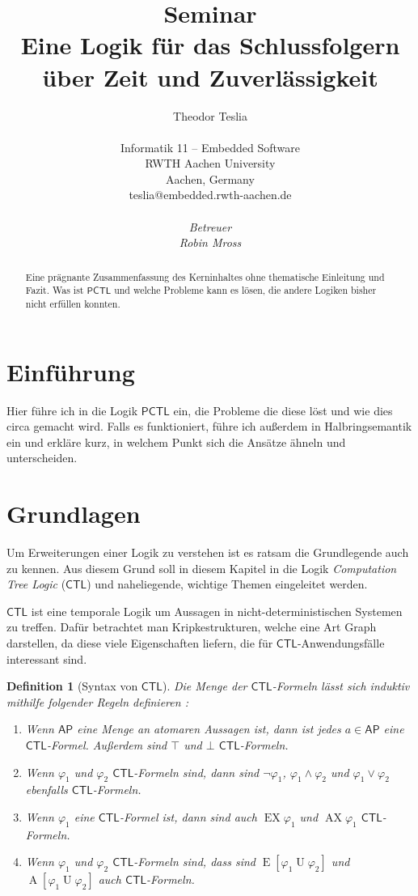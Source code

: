 \documentclass{lni}
\author{
	Theodor Teslia \\ 
	\\ 
	Informatik 11 -- Embedded Software \\ 
	RWTH Aachen University \\ 
	Aachen, Germany \\ 
	teslia@embedded.rwth-aachen.de\\
	\\
	\textit{Betreuer}\\
	\textit{Robin Mross}\\ %
}
\title{\small{Seminar} \\ \vspace{0.5cm} \Large{Eine Logik für das Schlussfolgern über Zeit und Zuverlässigkeit}}
\theoremstyle{def_style}
\newtheorem{definition}{Definition}[section]
\theoremstyle{break}
\newcommand{\AU}[2]{\operatorname{A}[#1\operatorname{U}#2]}
\newcommand{\EU}[2]{\operatorname{E}[#1\operatorname{U}#2]}
\newcommand{\CTL}{\mathsf{CTL}}
\newcommand{\PCTL}{\mathsf{PCTL}}
\begin{document}
\maketitle

\begin{abstract}
Eine prägnante Zusammenfassung des Kerninhaltes ohne thematische Einleitung und Fazit. Was ist $\PCTL$ und welche Probleme kann es lösen, die andere Logiken bisher nicht erfüllen konnten.
\end{abstract}

\section{Einführung}

Hier führe ich in die Logik $\PCTL$ ein, die Probleme die diese löst und wie dies circa gemacht wird.
Falls es funktioniert, führe ich außerdem in Halbringsemantik ein und erkläre kurz, in welchem Punkt sich die Ansätze ähneln und unterscheiden.

\section{Grundlagen}
\label{ChapGrundlagen}

Um Erweiterungen einer Logik zu verstehen ist es ratsam die Grundlegende auch zu kennen. Aus diesem Grund soll in diesem Kapitel in die Logik \textit{Computation Tree Logic} ($\CTL$) und naheliegende, wichtige Themen eingeleitet werden.

$\CTL$ ist eine temporale Logik um Aussagen in nicht-deterministischen Systemen zu treffen. 
Dafür betrachtet man Kripkestrukturen, welche eine Art Graph darstellen, da diese viele Eigenschaften liefern, die für $\CTL$-Anwendungsfälle interessant sind.

\begin{definition}[Syntax von $\CTL$]
	Die Menge der $\CTL$-Formeln lässt sich induktiv mithilfe folgender Regeln definieren \cite{clarke1982design, baier2008principles}:
	\begin{enumerate}
		\item Wenn $\mathsf{AP}$ eine Menge an atomaren Aussagen ist, dann ist jedes $a\in \mathsf{AP}$ eine $\CTL$-Formel. Außerdem sind $\top$ und $\bot$ $\CTL$-Formeln.
		\item Wenn $\varphi_1$ und $\varphi_2$ $\CTL$-Formeln sind, dann sind $\neg\varphi_1$, $\varphi_1 \land \varphi_2$ und $\varphi_1 \lor \varphi_2$ ebenfalls $\CTL$-Formeln.
		\item Wenn $\varphi_1$ eine $\CTL$-Formel ist, dann sind auch $\operatorname{EX}\varphi_1$ und $\operatorname{AX}\varphi_1$ $\CTL$-Formeln.
		\item Wenn $\varphi_1$ und $\varphi_2$ $\CTL$-Formeln sind, dass sind $\EU{\varphi_1}{\varphi_2}$ und $\AU{\varphi_1}{\varphi_2}$ auch $\CTL$-Formeln.
	\end{enumerate}
\end{definition}
\end{document}
